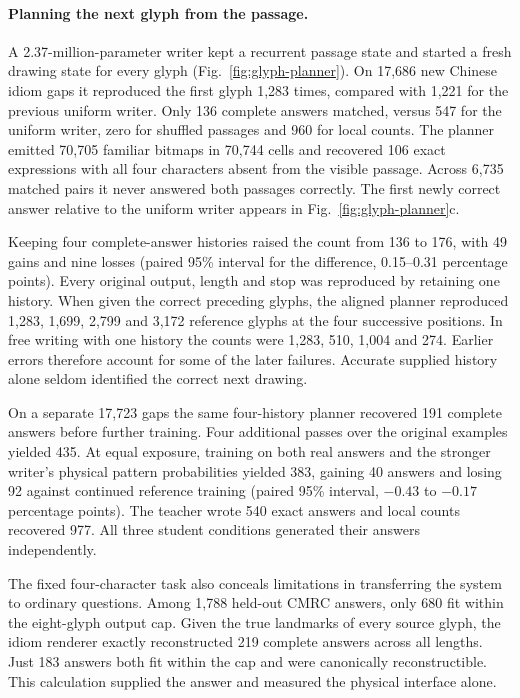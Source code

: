 \documentclass[12pt,a4paper]{article}
\providecommand{\DIFadd}[1]{{\protect\color{blue} \sf #1}} %
\begin{document}
\paragraph{\DIFadd{Planning the next glyph from the passage.}}
\DIFadd{A 2.37-million-parameter writer kept a recurrent passage state and started a fresh drawing state for every glyph (Fig.~\ref{fig:glyph-planner}). On 17,686 new Chinese idiom gaps it reproduced the first glyph 1,283 times, compared with 1,221 for the previous uniform writer. Only 136 complete answers matched, versus 547 for the uniform writer, zero for shuffled passages and 960 for local counts. The planner emitted 70,705 familiar bitmaps in 70,744 cells and recovered 106 exact expressions with all four characters absent from the visible passage. Across 6,735 matched pairs it never answered both passages correctly. The first newly correct answer relative to the uniform writer appears in Fig.~\ref{fig:glyph-planner}c.
}

\DIFadd{Keeping four complete-answer histories raised the count from 136 to 176, with 49 gains and nine losses (paired 95\% interval for the difference, 0.15--0.31 percentage points). Every original output, length and stop was reproduced by retaining one history. When given the correct preceding glyphs, the aligned planner reproduced 1,283, 1,699, 2,799 and 3,172 reference glyphs at the four successive positions. In free writing with one history the counts were 1,283, 510, 1,004 and 274. Earlier errors therefore account for some of the later failures. Accurate supplied history alone seldom identified the correct next drawing.
}

\DIFadd{On a separate 17,723 gaps the same four-history planner recovered 191 complete answers before further training. Four additional passes over the original examples yielded 435. At equal exposure, training on both real answers and the stronger writer's physical pattern probabilities yielded 383, gaining 40 answers and losing 92 against continued reference training (paired 95\% interval, $-0.43$ to $-0.17$ percentage points). The teacher wrote 540 exact answers and local counts recovered 977. All three student conditions generated their answers independently.
}

\DIFadd{The fixed four-character task also conceals limitations in transferring the system to ordinary questions. Among 1,788 held-out CMRC answers, only 680 fit within the eight-glyph output cap. Given the true landmarks of every source glyph, the idiom renderer exactly reconstructed 219 complete answers across all lengths. Just 183 answers both fit within the cap and were canonically reconstructible. This calculation supplied the answer and measured the physical interface alone.
}
\end{document}
